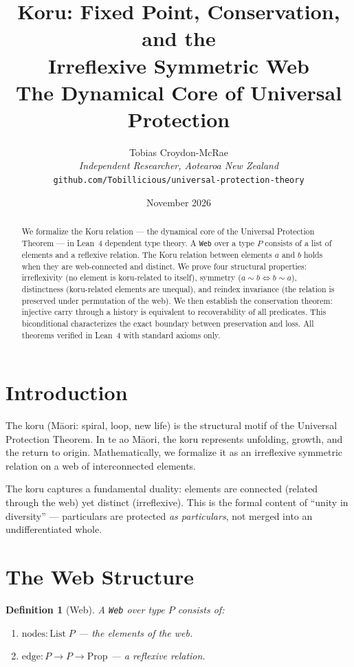 \documentclass[12pt,a4paper]{article}
\title{Koru: Fixed Point, Conservation, and the\\
Irreflexive Symmetric Web\\[0.5em]
\large The Dynamical Core of Universal Protection}
\author{Tobias Croydon-McRae\\
\textit{Independent Researcher, Aotearoa New Zealand}\\
\texttt{github.com/Tobillicious/universal-protection-theory}}
\date{November 2026}
\newtheorem{definition}[theorem]{Definition}
\begin{document}
\maketitle

\begin{abstract}
We formalize the Koru relation --- the dynamical core of the Universal
Protection Theorem --- in Lean~4 dependent type theory. A \texttt{Web}
over a type $P$ consists of a list of elements and a reflexive relation.
The Koru relation between elements $a$ and $b$ holds when they are
web-connected and distinct. We prove four structural properties:
irreflexivity (no element is koru-related to itself), symmetry
($a \sim b \iff b \sim a$), distinctness (koru-related elements are
unequal), and reindex invariance (the relation is preserved under
permutation of the web). We then establish the conservation theorem:
injective carry through a history is equivalent to recoverability of all
predicates. This biconditional characterizes the exact boundary between
preservation and loss. All theorems verified in Lean~4 with standard
axioms only.
\end{abstract}

\section{Introduction}

The koru (Māori: spiral, loop, new life) is the structural motif of
the Universal Protection Theorem. In te ao Māori, the koru represents
unfolding, growth, and the return to origin. Mathematically, we
formalize it as an irreflexive symmetric relation on a web of
interconnected elements.

The koru captures a fundamental duality: elements are connected
(related through the web) yet distinct (irreflexive). This is
the formal content of ``unity in diversity'' --- particulars are
protected \emph{as particulars}, not merged into an undifferentiated
whole.

\section{The Web Structure}

\begin{definition}[Web]
A \texttt{Web} over type $P$ consists of:
\begin{enumerate}
    \item $\text{nodes} : \text{List}\; P$ --- the elements of the web.
    \item $\text{edge} : P \to P \to \text{Prop}$ --- a reflexive relation.
\end{enumerate}
\end{definition}
\end{document}
